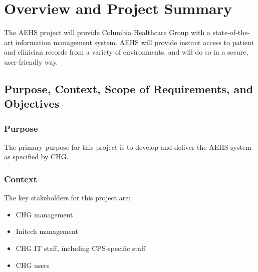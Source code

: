 \documentclass[11pt]{article}
\begin{document}
\tableofcontents
\clearpage


\section{Overview and Project Summary}

The AEHS project will provide Columbia Healthcare Group with a state-of-the-art information
management system.  AEHS will provide instant access to patient and clinician records from a variety
of environments, and will do so in a secure, user-friendly way.


\subsection{Purpose, Context, Scope of Requirements, and Objectives}

\subsubsection{Purpose}
The primary purpose for this project is to develop and deliver the AEHS system as specified by CHG.

\subsubsection{Context}
The key stakeholders for this project are:
\begin{itemize}
\item CHG management
\item Initech management
\item CHG IT staff, including CPS-specific staff
\item CHG users
\end{itemize}
\end{document}

